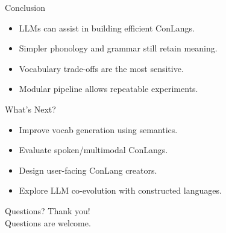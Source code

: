 \documentclass{beamer}
\begin{document}
\begin{frame}{Conclusion}
	\begin{itemize}
		\item LLMs can assist in building efficient ConLangs.
		\item Simpler phonology and grammar still retain meaning.
		\item Vocabulary trade-offs are the most sensitive.
		\item Modular pipeline allows repeatable experiments.
	\end{itemize}
\end{frame}

\begin{frame}{What's Next?}
	\begin{itemize}
		\item Improve vocab generation using semantics.
		\item Evaluate spoken/multimodal ConLangs.
		\item Design user-facing ConLang creators.
		\item Explore LLM co-evolution with constructed languages.
	\end{itemize}
\end{frame}

\begin{frame}{Questions?}
	\centering
	Thank you!\\
	Questions are welcome.
\end{frame}
\end{document}

